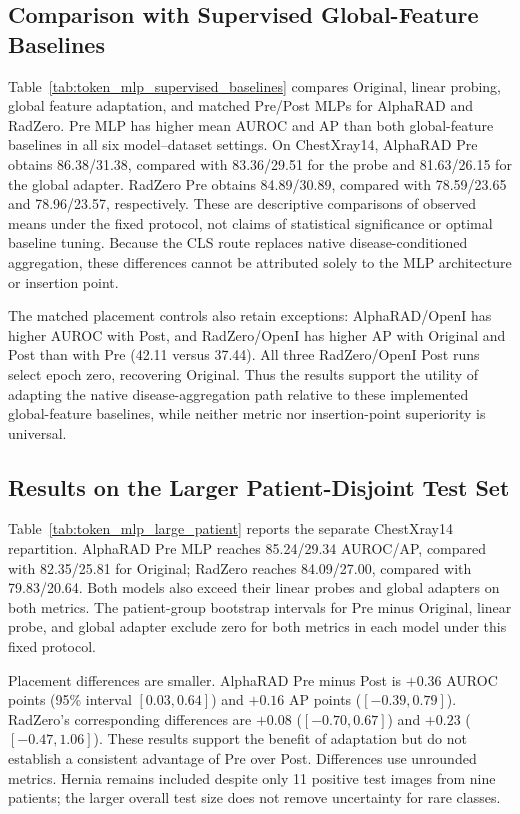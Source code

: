 \documentclass[10pt,twocolumn,letterpaper]{article}
\begin{document}
\subsection{Comparison with Supervised Global-Feature Baselines}
\label{sec:supervised_baseline_results}

Table~\ref{tab:token_mlp_supervised_baselines} compares Original, linear probing, global feature adaptation, and matched Pre/Post MLPs for AlphaRAD and RadZero. Pre MLP has higher mean AUROC and AP than both global-feature baselines in all six model--dataset settings. On ChestXray14, AlphaRAD Pre obtains 86.38/31.38, compared with 83.36/29.51 for the probe and 81.63/26.15 for the global adapter. RadZero Pre obtains 84.89/30.89, compared with 78.59/23.65 and 78.96/23.57, respectively. These are descriptive comparisons of observed means under the fixed protocol, not claims of statistical significance or optimal baseline tuning. Because the CLS route replaces native disease-conditioned aggregation, these differences cannot be attributed solely to the MLP architecture or insertion point.

The matched placement controls also retain exceptions: AlphaRAD/OpenI has higher AUROC with Post, and RadZero/OpenI has higher AP with Original and Post than with Pre (42.11 versus 37.44). All three RadZero/OpenI Post runs select epoch zero, recovering Original. Thus the results support the utility of adapting the native disease-aggregation path relative to these implemented global-feature baselines, while neither metric nor insertion-point superiority is universal.

\subsection{Results on the Larger Patient-Disjoint Test Set}

Table~\ref{tab:token_mlp_large_patient} reports the separate ChestXray14 repartition. AlphaRAD Pre MLP reaches 85.24/29.34 AUROC/AP, compared with 82.35/25.81 for Original; RadZero reaches 84.09/27.00, compared with 79.83/20.64. Both models also exceed their linear probes and global adapters on both metrics. The patient-group bootstrap intervals for Pre minus Original, linear probe, and global adapter exclude zero for both metrics in each model under this fixed protocol.

Placement differences are smaller. AlphaRAD Pre minus Post is $+0.36$ AUROC points (95\% interval $[0.03,0.64]$) and $+0.16$ AP points ($[-0.39,0.79]$). RadZero's corresponding differences are $+0.08$ ($[-0.70,0.67]$) and $+0.23$ ($[-0.47,1.06]$). These results support the benefit of adaptation but do not establish a consistent advantage of Pre over Post. Differences use unrounded metrics. Hernia remains included despite only 11 positive test images from nine patients; the larger overall test size does not remove uncertainty for rare classes.
\end{document}
